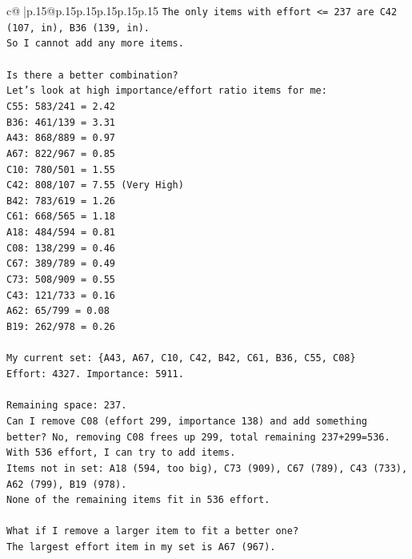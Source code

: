 \documentclass{article}
\begin{document}
{\begin{supertabular}{c@{$\;$}|p{.15\linewidth}@{}p{.15\linewidth}p{.15\linewidth}p{.15\linewidth}p{.15\linewidth}p{.15\linewidth}}
{{{\texttt{The only items with effort <= 237 are C42 (107, in), B36 (139, in).} \\
\texttt{So I cannot add any more items.} \\
\\ 
\texttt{Is there a better combination?} \\
\texttt{Let's look at high importance/effort ratio items for me:} \\
\texttt{C55: 583/241 = 2.42} \\
\texttt{B36: 461/139 = 3.31} \\
\texttt{A43: 868/889 = 0.97} \\
\texttt{A67: 822/967 = 0.85} \\
\texttt{C10: 780/501 = 1.55} \\
\texttt{C42: 808/107 = 7.55 (Very High)} \\
\texttt{B42: 783/619 = 1.26} \\
\texttt{C61: 668/565 = 1.18} \\
\texttt{A18: 484/594 = 0.81} \\
\texttt{C08: 138/299 = 0.46} \\
\texttt{C67: 389/789 = 0.49} \\
\texttt{C73: 508/909 = 0.55} \\
\texttt{C43: 121/733 = 0.16} \\
\texttt{A62: 65/799 = 0.08} \\
\texttt{B19: 262/978 = 0.26} \\
\\ 
\texttt{My current set: \{A43, A67, C10, C42, B42, C61, B36, C55, C08\}} \\
\texttt{Effort: 4327. Importance: 5911.} \\
\\ 
\texttt{Remaining space: 237.} \\
\texttt{Can I remove C08 (effort 299, importance 138) and add something better? No, removing C08 frees up 299, total remaining 237+299=536.} \\
\texttt{With 536 effort, I can try to add items.} \\
\texttt{Items not in set: A18 (594, too big), C73 (909), C67 (789), C43 (733), A62 (799), B19 (978).} \\
\texttt{None of the remaining items fit in 536 effort.} \\
\\ 
\texttt{What if I remove a larger item to fit a better one?} \\
\texttt{The largest effort item in my set is A67 (967).} \\
}}}
\end{supertabular}}
\end{document}
